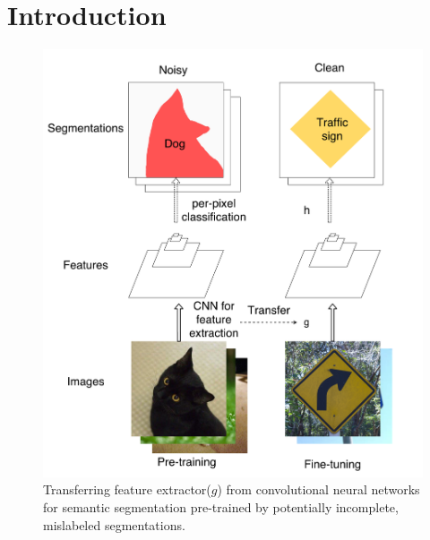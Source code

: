 \section{Introduction}
\label{introduction}




\begin{figure}[t]
\begin{center}
   \includegraphics[width=1.05\linewidth]{img/figure1}
\end{center}
   \caption{
   Transferring feature extractor($g$) from convolutional neural networks for semantic segmentation pre-trained by potentially incomplete, mislabeled segmentations.
   }
\label{fig:figure1}
\end{figure}



